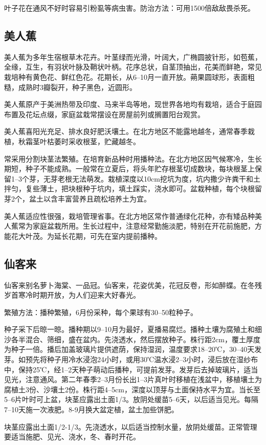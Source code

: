\documentclass{ctexbook}
\begin{document}
叶子花在通风不好时容易引粉虱等病虫害。防治方法：可用1500倍敌敌畏杀死。
\subsection{美人蕉}
美人蕉为多年生宿根草木花卉。叶茎绿而光滑，叶阔大，广椭圆披针形，如苞蕉，全缘，互生，有羽状叶脉及鞘状叶柄。花序总状，自茎顶抽出，花美而鲜艳，常见栽培种有黄色花、鲜红色花。花期长，从6--10月一直开放。蒴果圆球形，表面粗糙，成熟时3瓣裂开，种子黑色，近圆形。

美人蕉原产于美洲热带及印度、马来半岛等地，现世界各地均有栽培，适合于庭园布置及花坛点缀，家庭盆栽常摆设在房屋前列或搁置阳台观赏。

美人蕉喜阳光充足、排水良好肥沃壤土。在北方地区不能露地越冬，通常春季栽植，秋霜茎叶枯萎时采收根茎，贮藏越冬。

常采用分割块茎法繁殖。在培育新品种时用播种法。在北方地区因气候寒冷，生长期短，种子不能成熟。一般常在立夏后，将头年贮存根茎切成数块，每块根茎上保留1--3个芽，无芽老根无法萌发。栽植深度以10cm挖坑为度，坑内撒少许粪干和土拌匀，复些薄土，把块根种于坑内，填土踩实，浇水即可。盆栽种植，每个块根留芽2个，盆土以含丰富营养且疏松培养土为宜。

美人蕉适应性很强，栽培管理省事。在北方地区常作普通绿化花种，亦有矮品种美人蕉常为家庭盆栽所用。生长过程中，注意经常勤施淡肥，特别在开花前施肥，方能花大叶茂。为延长花期，可先在室内提前播种。
\subsection{仙客来}
仙客来别名萝卜海棠、一品冠。仙客来，花姿优美，花冠反卷，形如醉蝶。在冬残岁首寒冷时期开放，为人们迎来大好春光。

繁殖方法：播种繁殖，6月份采种，每个果球有30--50粒种子。

种子采下后晾一晾。播种期以9--10月为最好，夏播易腐烂。播种土壤为腐殖土和细沙各半混合、筛细，盛在盆内。先浇透水，然后摆放种子。株行距2cm，覆土厚度为种子一倍。播后加盖玻璃片提供遮荫，保持湿润，温度要求18--20℃，30--40天发芽。如预先将种子用冷水浸泡24小时，或用30℃温水浸2--3小时，浸后放在湿纱布中，保持25℃，经1--2天种子萌动后播种，可提前发芽。发芽后去掉玻璃片，适当见光，注意通风。第二年春季2--3月份长出1--3片真叶时移植在浅盆中，移植壤土为腐植土3份、沙壤土2份。株行距4--5cm，深度以顶芽与土面保持水平为宜。当长至5--6片叶时可上盆，块茎应露出土面1/3。放阴处缓苗5--6天，以后适当见光。每隔7--10天施一次液肥。8-9月换大盆定植，盆土加些饼肥。

块茎应露出土面1/2-1/3。先浇透水，以后适当控制水量，放阴处缓苗。正常管理要适当施肥、见光、浇水，冬、春时开花。
\end{document}
